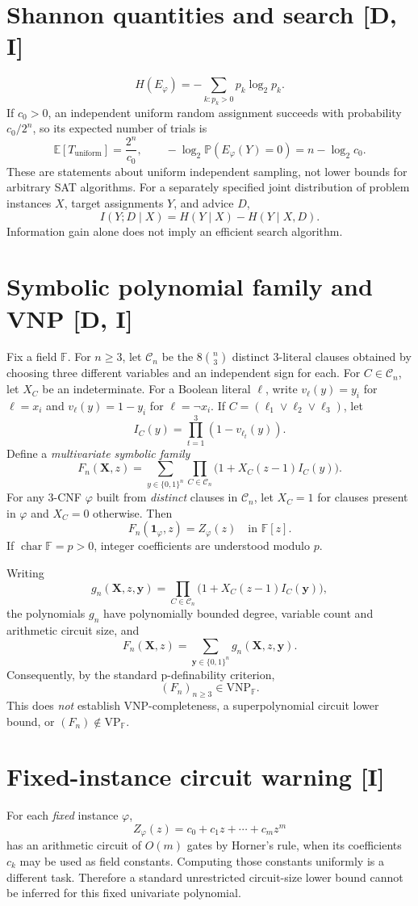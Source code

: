\documentclass[11pt]{article}
\newcommand{\E}{\mathbb{E}}
\newcommand{\Prb}{\mathbb{P}}
\newcommand{\VNP}{\mathrm{VNP}}
\newcommand{\VP}{\mathrm{VP}}
\newcommand{\F}{\mathbb{F}}
\begin{document}
\section{Shannon quantities and search [D, I]}
\[
H(E_\varphi)
=-\sum_{k:p_k>0}p_k\log_2p_k.
\]
If $c_0>0$, an independent uniform random assignment succeeds
with probability $c_0/2^n$, so its expected number of trials is
\[
\E[T_{\mathrm{uniform}}]=\frac{2^n}{c_0},
\qquad
-\log_2\Prb(E_\varphi(Y)=0)=n-\log_2c_0.
\]
These are statements about uniform independent sampling,
not lower bounds for arbitrary SAT algorithms.
For a separately specified joint distribution of problem
instances $X$, target assignments $Y$, and advice $D$,
\[
I(Y;D\mid X)=H(Y\mid X)-H(Y\mid X,D).
\]
Information gain alone does not imply an efficient search algorithm.

\section{Symbolic polynomial family and VNP [D, I]}
Fix a field $\F$. For $n\ge3$, let $\mathcal{C}_n$ be the
$8\binom n3$ distinct 3-literal clauses obtained by choosing
three different variables and an independent sign for each.
For $C\in\mathcal{C}_n$, let $X_C$ be an indeterminate.
For a Boolean literal $\ell$, write $v_\ell(y)=y_i$
for $\ell=x_i$ and $v_\ell(y)=1-y_i$ for $\ell=\neg x_i$.
If $C=(\ell_1\lor\ell_2\lor\ell_3)$, let
\[
I_C(y)=\prod_{t=1}^{3}(1-v_{\ell_t}(y)).
\]
Define a \emph{multivariate symbolic family}
\[
\boxed{
F_n(\mathbf X,z)
=\sum_{y\in\{0,1\}^n}
\prod_{C\in\mathcal C_n}
\bigl(1+X_C(z-1)I_C(y)\bigr).
}
\]
For any 3-CNF $\varphi$ built from \emph{distinct} clauses
in $\mathcal C_n$, let $X_C=1$ for clauses present in $\varphi$
and $X_C=0$ otherwise. Then
\[
F_n(\mathbf 1_\varphi,z)=Z_\varphi(z)
\quad\text{in }\F[z].
\]
If $\operatorname{char}\F=p>0$, integer coefficients are
understood modulo $p$.

Writing
\[
g_n(\mathbf X,z,\mathbf y)
=\prod_{C\in\mathcal C_n}
\bigl(1+X_C(z-1)I_C(\mathbf y)\bigr),
\]
the polynomials $g_n$ have polynomially bounded degree,
variable count and arithmetic circuit size, and
\[
F_n(\mathbf X,z)=\sum_{\mathbf y\in\{0,1\}^n}
g_n(\mathbf X,z,\mathbf y).
\]
Consequently, by the standard p-definability criterion,
\[
\boxed{(F_n)_{n\ge3}\in\VNP_{\F}.}
\]
This does \emph{not} establish VNP-completeness,
a superpolynomial circuit lower bound, or
$(F_n)\notin\VP_{\F}$.

\section{Fixed-instance circuit warning [I]}
For each \emph{fixed} instance $\varphi$,
\[
Z_\varphi(z)=c_0+c_1z+\cdots+c_mz^m
\]
has an arithmetic circuit of $O(m)$ gates by Horner's rule,
when its coefficients $c_k$ may be used as field constants.
Computing those constants uniformly is a different task.
Therefore a standard unrestricted circuit-size lower bound
cannot be inferred for this fixed univariate polynomial.
\end{document}
